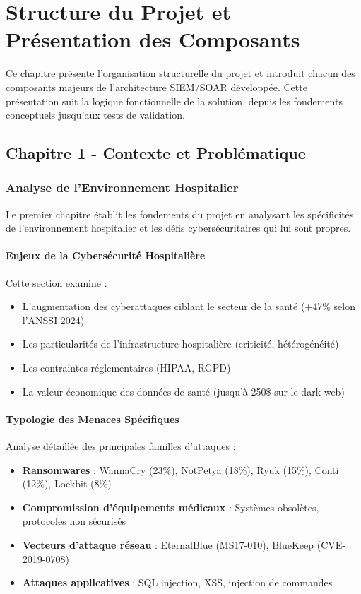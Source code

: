 \chapter{Structure du Projet et Présentation des Composants}

Ce chapitre présente l'organisation structurelle du projet et introduit chacun des composants majeurs de l'architecture SIEM/SOAR développée. Cette présentation suit la logique fonctionnelle de la solution, depuis les fondements conceptuels jusqu'aux tests de validation.

\section{Chapitre 1 - Contexte et Problématique}

\subsection{Analyse de l'Environnement Hospitalier}

Le premier chapitre établit les fondements du projet en analysant les spécificités de l'environnement hospitalier et les défis cybersécuritaires qui lui sont propres.

\subsubsection{Enjeux de la Cybersécurité Hospitalière}
Cette section examine :
\begin{itemize}
    \item L'augmentation des cyberattaques ciblant le secteur de la santé (+47\% selon l'ANSSI 2024)
    \item Les particularités de l'infrastructure hospitalière (criticité, hétérogénéité)
    \item Les contraintes réglementaires (HIPAA, RGPD)
    \item La valeur économique des données de santé (jusqu'à 250\$ sur le dark web)
\end{itemize}

\subsubsection{Typologie des Menaces Spécifiques}
Analyse détaillée des principales familles d'attaques :
\begin{itemize}
    \item \textbf{Ransomwares} : WannaCry (23\%), NotPetya (18\%), Ryuk (15\%), Conti (12\%), Lockbit (8\%)
    \item \textbf{Compromission d'équipements médicaux} : Systèmes obsolètes, protocoles non sécurisés
    \item \textbf{Vecteurs d'attaque réseau} : EternalBlue (MS17-010), BlueKeep (CVE-2019-0708)
    \item \textbf{Attaques applicatives} : SQL injection, XSS, injection de commandes
\end{itemize}

